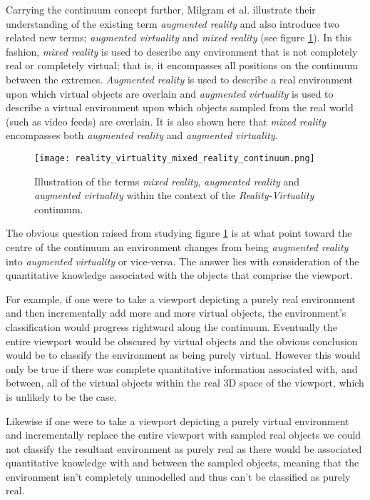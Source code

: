 Carrying the continuum concept further, Milgram et al. illustrate their understanding of the existing term \textit{augmented reality} and also introduce two related new terms; \textit{augmented virtuality} and \textit{mixed reality} (see figure \ref{reality_virtuality_mixed_reality_continuum.png}). In this fashion, \textit{mixed reality} is used to describe any environment that is not completely real or completely virtual; that is, it encompasses all positions on the continuum between the extremes. \textit{Augmented reality} is used to describe a real environment upon which virtual objects are overlain and \textit{augmented virtuality} is used to describe a virtual environment upon which objects sampled from the real world (such as video feeds) are overlain. It is also shown here that \textit{mixed reality} encompasses both \textit{augmented reality} and \textit{augmented virtuality}.

\begin{figure}[h]
\centering
\texttt{[image: reality\_virtuality\_mixed\_reality\_continuum.png]}
\caption{Illustration of the terms \textit{mixed reality}, \textit{augmented reality} and \textit{augmented virtuality} within the context of the \textit{Reality-Virtuality} continuum.}
\label{reality_virtuality_mixed_reality_continuum.png}
\end{figure}

The obvious question raised from studying figure \ref{reality_virtuality_mixed_reality_continuum.png} is at what point toward the centre of the continuum an environment changes from being \textit{augmented reality} into \textit{augmented virtuality} or vice-versa. The answer lies with consideration of the quantitative knowledge associated with the objects that comprise the viewport.

For example, if one were to take a viewport depicting a purely real environment and then incrementally add more and more virtual objects, the environment's classification would progress rightward along the continuum. Eventually the entire viewport would be obscured by virtual objects and the obvious conclusion would be to classify the environment as being purely virtual. However this would only be true if there was complete quantitative information associated with, and between, all of the virtual objects within the real 3D space of the viewport, which is unlikely to be the case.

Likewise if one were to take a viewport depicting a purely virtual environment and incrementally replace the entire viewport with sampled real objects we could not classify the resultant environment as purely real as there would be associated quantitative knowledge with and between the sampled objects, meaning that the environment isn't completely unmodelled and thus can't be classified as purely real.


